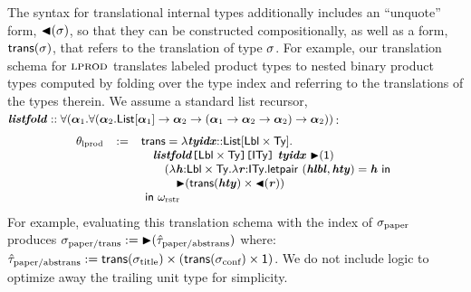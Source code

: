 \documentclass{llncs}
\begin{document}
The syntax for translational internal types additionally includes an ``unquote'' form,  ${\blacktriangleleft}(\sigma)$, so that they can be constructed compositionally, as well as a form, ${\sf trans}(\sigma)$, that refers to the translation of type $\sigma$. For example, our translation schema for $\textsc{lprod}$ translates labeled product types to nested binary product types computed by folding over the type index and referring to the translations of the types  therein. We assume a standard list recursor, $\small\svar{listfold} :: \kforall{\kalpha_1}{\kforall{\kalpha_2}{\klist{\kalpha_1}\rightarrow\kalpha_2\rightarrow(\kalpha_1\rightarrow\kalpha_2\rightarrow\kalpha_2)\rightarrow\kalpha_2}}$:
\[\small
\begin{array}{lcl}
\theta_\text{lprod} & := & \tcstruct{\slam{\klist{\klbl \times \kty}}{\svar{tyidx}}{\\
&&\quad\skap{\kity}{\skap{\klbl\times\kty}{\svar{listfold}}}~\svar{tyidx}~\sqity{\iunit}~\\&&
  \quad\quad (\lambda \svar{h}{:}\klbl \times \kty.\lambda \svar{r}{:}\kity.\keyw{letpair}~(\svar{hlbl},\svar{hty})=\svar{h}~\keyw{in}~\\&&
  \quad\quad\quad \sqity{\srep{\svar{hty}}\times\qtuq{\svar{r}}}}\\&&}{\omega_\text{rstr}}
\end{array}\]
For example, evaluating this translation schema with the index of $\sigma_\text{paper}$ produces $\sigma_\text{paper/trans} := {\blacktriangleright}(\hat{\tau}_\text{paper/abstrans})$ where: $\small\qity_\text{paper/abstrans} := \srep{\stx{title}}\times(\srep{\stx{conf}}\times \iunit)$. We do not include logic to optimize away the trailing unit type for simplicity.%
\end{document}
